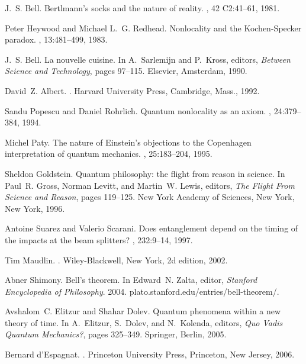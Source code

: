 \documentclass[12pt]{article} %
\begin{document}
\begin{thebibliography}{10}

J.~S. Bell.
\newblock Bertlmann's socks and the nature of reality.
, 42 C2:41--61, 1981.

Peter Heywood and Michael L.~G. Redhead.
\newblock Nonlocality and the {K}ochen-{S}pecker paradox.
, 13:481--499, 1983.

J.~S. Bell.
\newblock La nouvelle cuisine.
\newblock In A.~Sarlemijn and P.~Kross, editors, {\em Between Science and
  Technology}, pages 97--115. Elsevier, Amsterdam, 1990.

David~Z. Albert.
.
\newblock Harvard University Press, Cambridge, Mass., 1992.

Sandu Popescu and Daniel Rohrlich.
\newblock Quantum nonlocality as an axiom.
, 24:379--384, 1994.

Michel Paty.
\newblock The nature of {E}instein's objections to the {C}openhagen
  interpretation of quantum mechanics.
, 25:183--204, 1995.

Sheldon Goldstein.
\newblock Quantum philosophy: the flight from reason in science.
\newblock In Paul~R. Gross, Norman Levitt, and Martin~W. Lewis, editors, {\em
  The Flight From Science and Reason}, pages 119--125. New York Academy of
  Sciences, New York, New York, 1996.

Antoine Suarez and Valerio Scarani.
\newblock Does entanglement depend on the timing of the impacts at the beam
  splitters?
, 232:9--14, 1997.

Tim Maudlin.
.
\newblock Wiley-Blackwell, New York, 2d edition, 2002.

Abner Shimony.
\newblock Bell's theorem.
\newblock In Edward~N. Zalta, editor, {\em Stanford Encyclopedia of
  Philosophy}. 2004.
\newblock plato.stanford.edu/entries/bell-theorem/.

Avshalom~C. Elitzur and Shahar Dolev.
\newblock Quantum phenomena within a new theory of time.
\newblock In A.~Elitzur, S.~Dolev, and N.~Kolenda, editors, {\em Quo Vadis
  Quantum Mechanics?}, pages 325--349. Springer, Berlin, 2005.

Bernard d'Espagnat.
.
\newblock Princeton University Press, Princeton, New Jersey, 2006.


\end{thebibliography}
\end{document}
